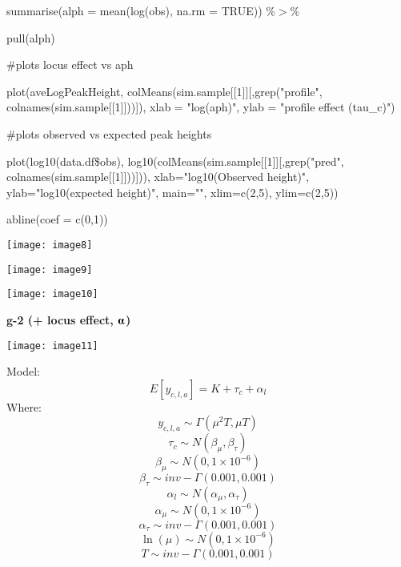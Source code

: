\documentclass{article} %
\begin{document}
\noindent       summarise(alph = mean(log(obs), na.rm = TRUE)) \%$\mathrm{>}$\%

\noindent       pull(alph)

\noindent 

\noindent \#plots locus effect vs aph

\noindent plot(aveLogPeakHeight, colMeans(sim.sample[[1]][,grep("profile", colnames(sim.sample[[1]]))]), xlab = "log(aph)", ylab = "profile effect (tau\_c)")

\noindent 

\noindent \#plots observed vs expected peak heights

\noindent plot(log10(data.df\$obs), log10(colMeans(sim.sample[[1]][,grep("pred", colnames(sim.sample[[1]]))])), xlab="log10(Observed height)", ylab="log10(expected height)", main="", xlim=c(2,5), ylim=c(2,5))

\noindent abline(coef = c(0,1))

\noindent 

\noindent 

\noindent \texttt{[image: image8]}

\noindent 

\noindent \texttt{[image: image9]}

\noindent 

\noindent \texttt{[image: image10]}

\noindent 

\noindent \eject 

\noindent \textbf{g-2 (+ locus effect, $\boldsymbol{\alphaup}$)}

\noindent 

\noindent \texttt{[image: image11]}

\noindent 

\noindent Model:
\[E\left[y_{c,l,a} \right]=K+\tau _{c} +\alpha _{l} \] 
Where:
\[y_{c,l,a} \sim \Gamma \left(\mu ^{2} T,\mu T\right)\] 
\[\tau _{c} \sim N\left(\beta _{\mu } ,\beta _{\tau } \right)\] 
\[\beta _{\mu } \sim N(0,1\times 10^{-6} )\] 
\[\beta _{\tau } \sim inv-\Gamma (0.001,0.001)\] 
\[\alpha _{l} \sim N\left(\alpha _{\mu } ,\alpha _{\tau } \right)\] 
\[\alpha _{\mu } \sim N(0,1\times 10^{-6} )\] 
\[\alpha _{\tau } \sim inv-\Gamma (0.001,0.001)\] 
\[\ln (\mu )\sim N(0,1\times 10^{-6} )\] 
\[T\sim inv-\Gamma (0.001,0.001)\] 
\end{document}
